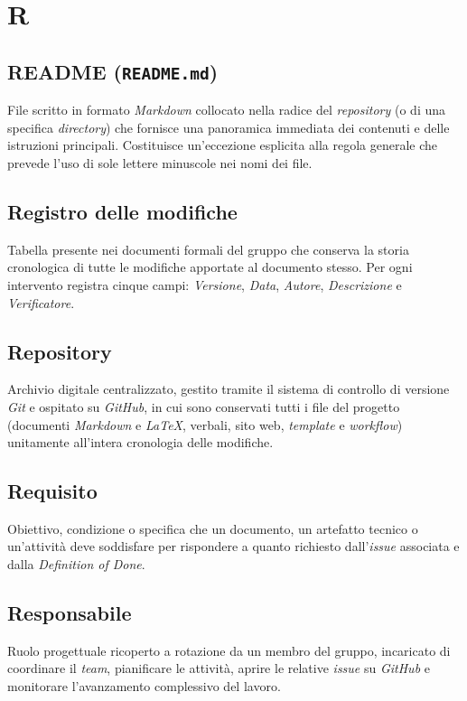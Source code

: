 \documentclass[11pt, a4paper]{article}
\begin{document}
\newpage

\section*{R}

\subsection*{README (\texttt{README.md})}
File scritto in formato \textit{Markdown} collocato nella radice del \textit{repository} (o di una specifica \textit{directory}) che fornisce una panoramica immediata dei contenuti e delle istruzioni principali. Costituisce un'eccezione esplicita alla regola generale che prevede l'uso di sole lettere minuscole nei nomi dei file.

\subsection*{Registro delle modifiche}
Tabella presente nei documenti formali del gruppo che conserva la storia cronologica di tutte le modifiche apportate al documento stesso. Per ogni intervento registra cinque campi: \textit{Versione}, \textit{Data}, \textit{Autore}, \textit{Descrizione} e \textit{Verificatore}.

\subsection*{Repository}
Archivio digitale centralizzato, gestito tramite il sistema di controllo di versione \textit{Git} e ospitato su \textit{GitHub}, in cui sono conservati tutti i file del progetto (documenti \textit{Markdown} e \textit{LaTeX}, verbali, sito web, \textit{template} e \textit{workflow}) unitamente all'intera cronologia delle modifiche.

\subsection*{Requisito}
Obiettivo, condizione o specifica che un documento, un artefatto tecnico o un'attività deve soddisfare per rispondere a quanto richiesto dall'\textit{issue} associata e dalla \textit{Definition of Done}.

\subsection*{Responsabile}
Ruolo progettuale ricoperto a rotazione da un membro del gruppo, incaricato di coordinare il \textit{team}, pianificare le attività, aprire le relative \textit{issue} su \textit{GitHub} e monitorare l'avanzamento complessivo del lavoro.
\end{document}
